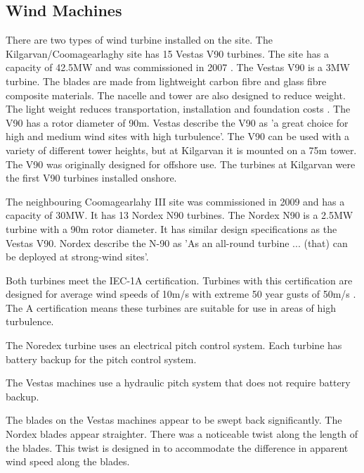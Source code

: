 \documentclass[12pt]{article} %
\begin{document}
\subsection{Wind Machines}
There are two types of wind turbine installed on the site. The Kilgarvan/Coomagearlaghy site has 15 Vestas V90 turbines. The site has a capacity of 42.5MW and was commissioned in 2007 \cite{iwea}.
The Vestas V90 is a 3MW turbine. The blades are made from lightweight carbon fibre and glass fibre composite materials. The nacelle and tower are also designed to reduce weight. The light weight reduces transportation, installation and foundation costs \cite{v90-3.0}. The V90 has a rotor diameter of 90m.
Vestas \cite{v90-3.0} describe the V90 as 'a great choice for high and medium wind sites with high turbulence'. 
The V90 can be used with a variety of different tower heights, but at Kilgarvan it is mounted on a 75m tower. The V90 was originally designed for offshore use. The turbines at Kilgarvan were the first V90 turbines installed onshore.

The neighbouring Coomagearlahy III site was commissioned in 2009 and has a capacity of 30MW. It has 13 Nordex N90 turbines. The Nordex N90 is a 2.5MW turbine with a 90m rotor diameter. It has similar design specifications as the Vestas V90. Nordex \cite{n90} describe the N-90 as 'As an all-round turbine ... (that) can be deployed at strong-wind sites'.

Both turbines meet the IEC-1A certification. Turbines with this certification are designed for average wind speeds of 10m/s with extreme 50 year gusts of 50m/s \cite{burton_wind_2001}. The A certification means these turbines are suitable for use in areas of high turbulence.

The Noredex turbine uses an electrical pitch control system. Each turbine has battery backup for the pitch control system.

The Vestas machines use a hydraulic pitch system that does not require battery backup.

The blades on the Vestas machines appear to be swept back significantly. The Nordex blades appear straighter. There was a noticeable twist along the length of the blades. This twist is designed in to accommodate the difference in apparent wind speed along the blades.
\end{document}
